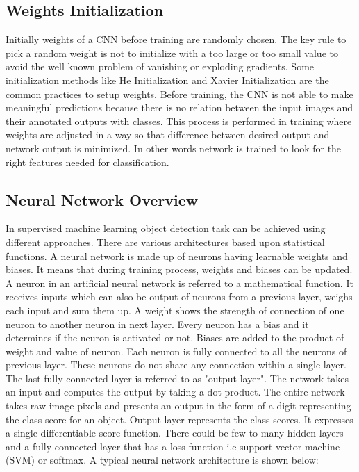 \documentclass[11pt]{article}
\begin{document}
\subsection{Weights Initialization}
Initially weights of a CNN before training are randomly chosen. The key rule to pick a random weight is not to initialize with a too large or too small value to avoid the well known problem of vanishing or exploding gradients. Some initialization methods like He Initialization and Xavier Initialization are the common practices to setup weights. Before training, the CNN is not able to make meaningful predictions because there is no relation between the input images and their annotated outputs with classes. This process is performed in training where weights are adjusted in a way so that difference between desired output and network output is minimized. In other words network is trained to look for the right features needed for classification.

\subsection{Neural Network Overview}
In supervised machine learning object detection task can be achieved using different approaches. There are various architectures based upon statistical functions. A neural network is made up of neurons having learnable weights and biases. It means that during training process, weights and biases can be updated. A neuron in an artificial neural network is referred to a mathematical function. It receives inputs which can also be output of neurons from a previous layer, weighs each input and sum them up. A weight shows the strength of connection of one neuron to another neuron in next layer. Every neuron has a bias and it determines if the neuron is activated or not. Biases are added to the product of weight and value of neuron. Each neuron is fully connected to all the neurons of previous layer. These neurons do not share any connection within a single layer. The last fully connected layer is referred to as "output layer". The network takes an input and computes the output by taking a dot product. The entire network takes raw image pixels and presents an output in the form of a digit representing the class score for an object. Output layer represents the class scores. It expresses a single differentiable score function. There could be few to many hidden layers and a fully connected layer that has a loss function i.e support vector machine (SVM) or softmax. A typical neural network architecture is shown below:
\end{document}

